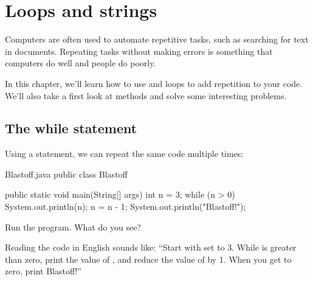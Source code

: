 \chapter{Loops and strings}

Computers are often used to automate repetitive tasks, such as searching for text in documents.
Repeating tasks without making errors is something that computers do well and people do poorly.

In this chapter, we'll learn how to use  and  loops to add repetition to your code.
We'll also take a first look at  methods and solve some interesting problems.



\section{The while statement}
\label{The_while_statement}


Using a  statement, we can repeat the same code multiple times:

\begin{trinket} [230] {Blastoff.java}
public class Blastoff {

    public static void main(String[] args) {
       int n = 3;
       while (n > 0) {
          System.out.println(n);
          n = n - 1;
       }
       System.out.println("Blastoff!");
    }
}
\end{trinket}

Run the program.  What do you see?

Reading the code in English sounds like: ``Start with  set to 3.
While  is greater than zero, print the value of , and reduce the value of  by 1.
When you get to zero, print Blastoff!''
%

